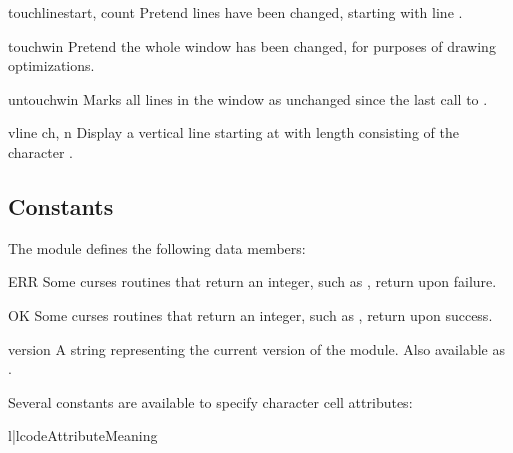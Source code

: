 \begin{methoddesc}{touchline}{start, count}
Pretend  lines have been changed, starting with line
.
\end{methoddesc}

\begin{methoddesc}{touchwin}{}
Pretend the whole window has been changed, for purposes of drawing
optimizations.
\end{methoddesc}

\begin{methoddesc}{untouchwin}{}
Marks all lines in  the  window  as unchanged since the last call to
. 
\end{methoddesc}

\begin{methoddesc}{vline}{ ch, n}
Display a vertical line starting at  with
length  consisting of the character .
\end{methoddesc}

\subsection{Constants}

The  module defines the following data members:

\begin{datadesc}{ERR}
Some curses routines  that  return  an integer, such as 
, return  upon failure.  
\end{datadesc}

\begin{datadesc}{OK}
Some curses routines  that  return  an integer, such as 
, return  upon success.  
\end{datadesc}

\begin{datadesc}{version}
A string representing the current version of the module. 
Also available as .
\end{datadesc}

Several constants are available to specify character cell attributes:

\begin{tableii}{l|l}{code}{Attribute}{Meaning}
\end{tableii}

